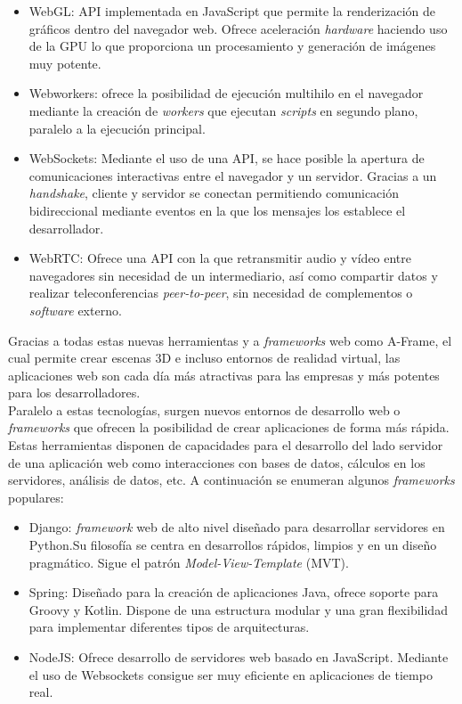 \documentclass[a4paper, 12pt]{book}
\begin{document}
		\begin{itemize}
			\item WebGL: API implementada en JavaScript que permite la renderización de gráficos dentro del navegador web. Ofrece aceleración \textit{hardware} haciendo uso de la GPU lo que proporciona un procesamiento y generación de imágenes muy potente.
			\item Webworkers: ofrece la posibilidad de ejecución multihilo en el navegador mediante la creación de \textit{workers} que ejecutan \textit{scripts} en segundo plano, paralelo a la ejecución principal.
			\item WebSockets: Mediante el uso de una API, se hace posible la apertura de comunicaciones interactivas entre el navegador y un servidor. Gracias a un \textit{handshake}, cliente y servidor se conectan permitiendo comunicación bidireccional mediante eventos en la que los mensajes los establece el desarrollador.
			\item WebRTC: Ofrece una API con la que retransmitir audio y vídeo entre navegadores sin necesidad de un intermediario, así como compartir datos y realizar teleconferencias \textit{peer-to-peer}, sin necesidad de complementos o \textit{software} externo.
		\end{itemize}
			
		Gracias a todas estas nuevas herramientas y a \textit{frameworks} web como A-Frame, el cual permite crear escenas 3D e incluso entornos de realidad virtual, las aplicaciones web son cada día más atractivas para las empresas y más potentes para los desarrolladores. \\
		
		Paralelo a estas tecnologías, surgen nuevos entornos de desarrollo web o \textit{frameworks} que ofrecen la posibilidad de crear aplicaciones de forma más rápida. Estas herramientas disponen de capacidades para el desarrollo del lado servidor de una aplicación web como interacciones con bases de datos, cálculos en los servidores, análisis de datos, etc. A continuación se enumeran algunos \textit{frameworks} populares:
		
		\begin{itemize}
			\item Django: \textit{framework} web de alto nivel diseñado para desarrollar servidores en Python.Su filosofía se centra en desarrollos rápidos, limpios y en un diseño pragmático. Sigue el patrón \textit{Model-View-Template} (MVT).
			\item Spring: Diseñado para la creación de aplicaciones Java, ofrece soporte para Groovy y Kotlin. Dispone de una estructura modular y una gran flexibilidad para implementar diferentes tipos de arquitecturas.
			\item NodeJS: Ofrece desarrollo de servidores web basado en JavaScript. Mediante el uso de Websockets consigue ser muy eficiente en aplicaciones de tiempo real.
		\end{itemize}
		
\end{document}
